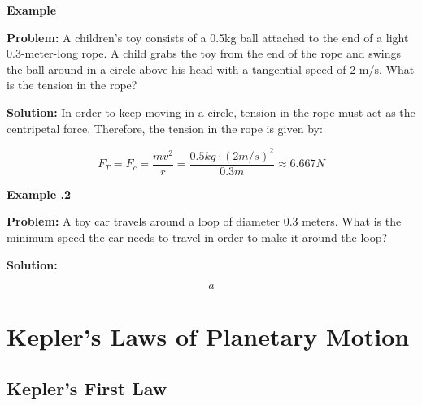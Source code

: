 	
	\begin{mdframed}[backgroundcolor=blue!10!white]
		\begin{center}
			\textbf{Example \thesubsection}
		\end{center}
		\textbf{Problem:} A children's toy consists of a 0.5kg ball attached to the end of a light 0.3-meter-long rope.  A child grabs the toy from the end of the rope and swings the ball around in a circle above his head with a tangential speed of 2 m/s.  What is the tension in the rope? 
		
		\vspace{0.1in}
		
		\textbf{Solution:} In order to keep moving in a circle, tension in the rope must act as the centripetal force.  Therefore, the tension in the rope is given by:
	
		\begin{equation*}
			F_T = F_c = \frac{mv^2}{r} = \frac{0.5 kg \cdot (2 m/s )^2}{0.3m} \approx \boxed{6.667 N}
		\end{equation*}
		
		\end{mdframed}
	
	
		\begin{mdframed}[backgroundcolor=blue!10!white]
		\begin{center}
			\textbf{Example \thesubsection.2}
		\end{center}
		\textbf{Problem:} A toy car travels around a loop of diameter 0.3 meters.  What is the minimum speed the car needs to travel in order to make it around the loop?
		
		\vspace{0.1in}
		
		\textbf{Solution:} 
		
		\begin{equation*}
		a
		\end{equation*}
		
	\end{mdframed}
	
	
	
	\section{Kepler's Laws of Planetary Motion}  
	\subsection{Kepler's First Law}
